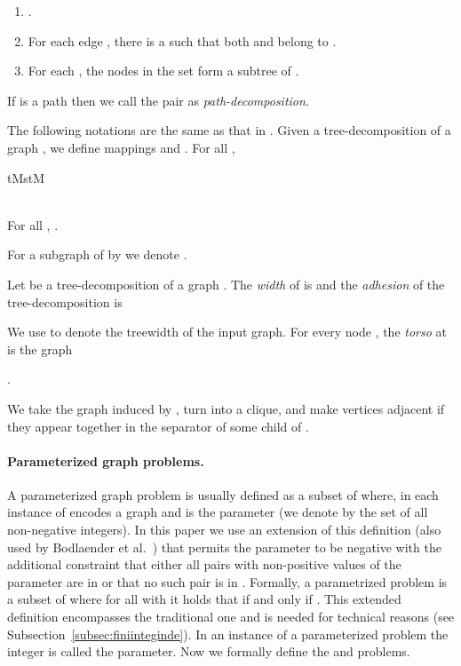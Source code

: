 \documentclass[11pt]{article}
\begin{document}
\begin{enumerate}
\item .
\item For each edge , there is a  such that both  and  belong to .
\item For each , the nodes in the set  form a subtree of .
\end{enumerate}
If  is a path then we call the pair    as {\em path-decomposition}.

\noindent
The following notations are the same as that in \cite{GroheM12}. Given a tree-decomposition of a graph 
, 
we define mappings   and . 
 For all ,\\
\begin{center}
tMstM\end{center}

\\



For all , . 

For a subgraph  of  by  we denote . 
\medskip
\noindent



Let  be a tree-decomposition of a graph . The {\em width} of  is 
 and the {\em adhesion}  of the tree-decomposition is 
 
We use  to denote the treewidth of the input graph. For every node , the {\em torso} at  is the graph 

\begin{center}
.
\end{center}

We take the graph induced by , turn  into a clique, and make vertices  adjacent if they appear together in the separator  of some child  of .


\paragraph{Parameterized graph problems.}
A parameterized graph problem   is usually defined as a subset of 
where, in each instance  of   encodes a graph and  is the parameter (we denote by  the set of all non-negative integers). In this paper we use an extension of this definition (also used by Bodlaender et al.~\cite{H.Bodlaender:2009ng}) that permits the parameter  to be negative 
with the additional constraint that either all pairs with non-positive values of the parameter 
are in  or that no such pair is in . Formally, a parametrized problem 
is a subset of  where for all 
with  it holds that  if and only if  .
This extended definition encompasses the traditional one and is needed for technical reasons  
(see Subsection~\ref{subsec:finiinteginde}).
In an instance of a parameterized problem  the integer  is called the parameter. Now we formally define the 
 and  problems. 
\end{document}
